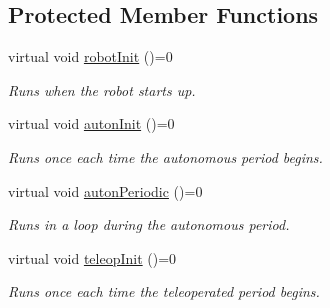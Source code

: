 \subsection*{Protected Member Functions}
\begin{DoxyCompactItemize}
\item 
\mbox{\label{classlib_iterative_robot_1_1_robot_base_a54d9a7504202639a537b0b4089af8223}} 
virtual void \mbox{\hyperlink{classlib_iterative_robot_1_1_robot_base_a54d9a7504202639a537b0b4089af8223}{robot\+Init}} ()=0
\begin{DoxyCompactList}\small\item\em Runs when the robot starts up. \end{DoxyCompactList}\item 
\mbox{\label{classlib_iterative_robot_1_1_robot_base_a956f7fff737d98b6e46d2cbb7e9a43dd}} 
virtual void \mbox{\hyperlink{classlib_iterative_robot_1_1_robot_base_a956f7fff737d98b6e46d2cbb7e9a43dd}{auton\+Init}} ()=0
\begin{DoxyCompactList}\small\item\em Runs once each time the autonomous period begins. \end{DoxyCompactList}\item 
\mbox{\label{classlib_iterative_robot_1_1_robot_base_ad2a97fc3eb00af6c3083f66868bb7c94}} 
virtual void \mbox{\hyperlink{classlib_iterative_robot_1_1_robot_base_ad2a97fc3eb00af6c3083f66868bb7c94}{auton\+Periodic}} ()=0
\begin{DoxyCompactList}\small\item\em Runs in a loop during the autonomous period. \end{DoxyCompactList}\item 
\mbox{\label{classlib_iterative_robot_1_1_robot_base_a36918ce992a84d3b4575d9e45dcf2b12}} 
virtual void \mbox{\hyperlink{classlib_iterative_robot_1_1_robot_base_a36918ce992a84d3b4575d9e45dcf2b12}{teleop\+Init}} ()=0
\begin{DoxyCompactList}\small\item\em Runs once each time the teleoperated period begins. \end{DoxyCompactList}\item 

\end{DoxyCompactItemize}
